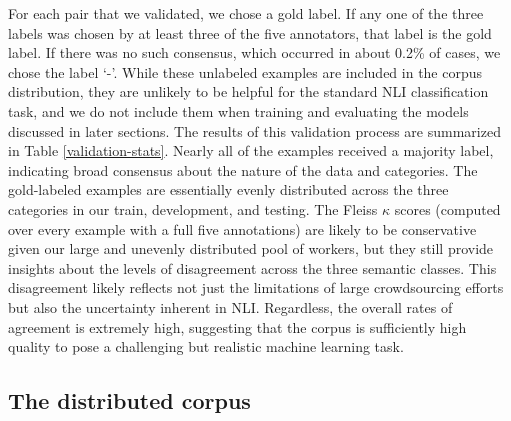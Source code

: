 For each pair that we validated, we chose a gold label. If any one of
the three labels was chosen by at least three of the five annotators,
that label is the gold label. If there was no such consensus, which
occurred in about 0.2\% of cases, we chose the label `-'. While these
unlabeled examples are included in the corpus distribution, they are
unlikely to be helpful for the standard NLI classification task, and
we do not include them when training and evaluating the models
discussed in later sections. The results of this validation process
are summarized in Table \ref{validation-stats}. 
Nearly all of the examples received a majority
label, indicating broad consensus about the nature of the data and
categories. The gold-labeled examples are essentially evenly
distributed across the three categories in our train, development, and
testing. The Fleiss $\kappa$ scores 
(computed over every example with a full five annotations)
are likely to be conservative given our large and
unevenly distributed pool of workers, but they still provide insights
about the levels of disagreement across the three semantic
classes. This disagreement likely reflects not just the limitations of
large crowdsourcing efforts but also the uncertainty inherent in NLI.
Regardless, the overall rates of agreement is extremely high,
suggesting that the corpus is sufficiently high quality to pose a
challenging but realistic machine learning task.


\noindent{}

\subsection{The distributed corpus}

